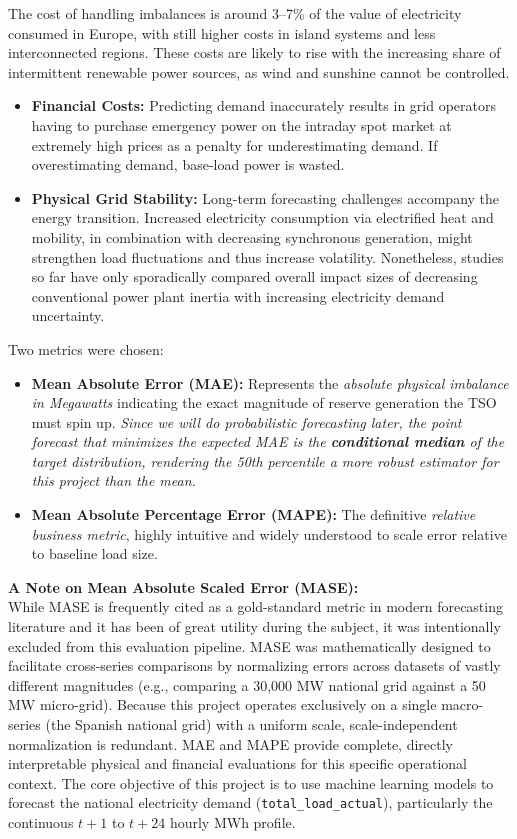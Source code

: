 \documentclass{article}
\begin{document}
The cost of handling imbalances is around 3–7\% of the value of electricity consumed in Europe, with still higher costs in island systems and less interconnected regions. These costs are likely to rise with the increasing share of intermittent renewable power sources, as wind and sunshine cannot be controlled.
\begin{itemize}
    \item \textbf{Financial Costs:} Predicting demand inaccurately results in grid operators having to purchase emergency power on the intraday spot market at extremely high prices as a penalty for underestimating demand. If overestimating demand, base-load power is wasted.
    \item \textbf{Physical Grid Stability:} Long-term forecasting challenges accompany the energy transition. Increased electricity consumption via electrified heat and mobility, in combination with decreasing synchronous generation, might strengthen load fluctuations and thus increase volatility. Nonetheless, studies so far have only sporadically compared overall impact sizes of decreasing conventional power plant inertia with increasing electricity demand uncertainty.
\end{itemize}


Two metrics were chosen:
\begin{itemize}
\item \textbf{Mean Absolute Error (MAE):} Represents the \textit{absolute physical imbalance in Megawatts} indicating the exact magnitude of reserve generation the TSO must spin up. \textit{Since we will do probabilistic forecasting later, the point forecast that minimizes the expected MAE is the \textbf{conditional median} of the target distribution, rendering the 50th percentile a more robust estimator for this project than the mean.}    
\item \textbf{Mean Absolute Percentage Error (MAPE):} The definitive \textit{relative business metric}, highly intuitive and widely understood to scale error relative to baseline load size.
\end{itemize}

\vspace{0.2cm}
\noindent \textbf{A Note on Mean Absolute Scaled Error (MASE):} \\
While MASE is frequently cited as a gold-standard metric in modern forecasting literature and it has been of great utility during the subject, it was intentionally excluded from this evaluation pipeline. MASE was mathematically designed to facilitate cross-series comparisons by normalizing errors across datasets of vastly different magnitudes (e.g., comparing a 30,000 MW national grid against a 50 MW micro-grid). Because this project operates exclusively on a single macro-series (the Spanish national grid) with a uniform scale, scale-independent normalization is redundant. MAE and MAPE provide complete, directly interpretable physical and financial evaluations for this specific operational context.
The core objective of this project is to use machine learning models to forecast the national electricity demand (\texttt{total\_load\_actual}), particularly the continuous $t+1$ to $t+24$ hourly MWh profile.
\end{document}
